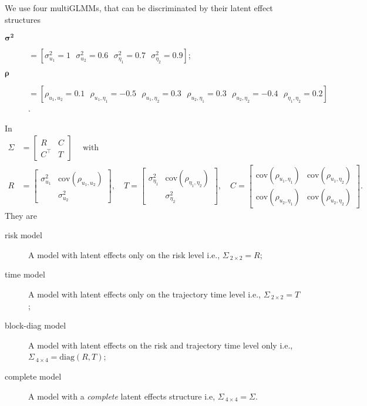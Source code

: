 We use four multiGLMMs, that can be discriminated by their latent effect
structures
\begin{description}
 \item[\(\bm{\sigma^{2}}\)] \(= [\sigma_{u_{1}}^{2} = 1~~~
                                \sigma_{u_{2}}^{2} = 0.6~~~
                                \sigma_{\eta_{1}}^{2} = 0.7~~~
                                \sigma_{\eta_{2}}^{2} = 0.9]\);
 \item[\(\bm{\rho}\)] \(= [\rho_{u_{1},u_{2}} = 0.1~~~
                           \rho_{u_{1},\eta_{1}} = -0.5~~~
                           \rho_{u_{1},\eta_{2}} = 0.3~~~
                           \rho_{u_{2},\eta_{1}} = 0.3~~~
                           \rho_{u_{2},\eta_{2}} = -0.4~~~
                           \rho_{\eta_{1},\eta_{2}} = 0.2]\).
\end{description}
In
\begin{align*}
 \Sigma &= \begin{bmatrix} R & C\\ C^{\top} & T \end{bmatrix}
 \quad~\text{with}\\
 R &= \begin{bmatrix}
       \sigma_{u_{1}}^{2} & \text{cov}(\rho_{u_{1},u_{2}})\\
                      & \sigma_{u_{2}}^{2}
      \end{bmatrix},\quad
 T = \begin{bmatrix}
      \sigma_{\eta_{1}}^{2} & \text{cov}(\rho_{\eta_{1},\eta_{2}})\\
                         & \sigma_{\eta_{2}}^{2}
     \end{bmatrix},\quad
 C = \begin{bmatrix} \text{cov}(\rho_{u_{1},\eta_{1}}) &
                     \text{cov}(\rho_{u_{1},\eta_{2}})\\
                     \text{cov}(\rho_{u_{2},\eta_{1}}) &
                     \text{cov}(\rho_{u_{2},\eta_{2}})
     \end{bmatrix}.
\end{align*}
They are
\begin{description}
 \item[risk model] A model with latent effects only on the risk level
      i.e., \(\Sigma_{~2\times2} = R\);

 \item[time model] A model with latent effects only on the trajectory
      time level i.e., \(\Sigma_{~2\times2} = T\);

 \item[block-diag model] A model with latent effects on the risk and
      trajectory time level only i.e., \(\Sigma_{~4\times4} =
      \text{diag}(R, T)\);

 \item[complete model] A model with a \textit{complete} latent effects
      structure i.e, \(\Sigma_{~4\times4} = \Sigma\).
\end{description}
